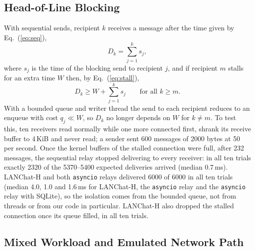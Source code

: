 \documentclass[graybox]{svmult}
\newcommand{\code}[1]{\texttt{#1}}
\newcommand{\lch}{\mbox{LANChat-H}}
\begin{document}
\subsection{Head-of-Line Blocking}
With sequential sends, recipient $k$ receives a message after the time given by Eq.~(\ref{eq:seq}),
\begin{equation}
D_k = \sum_{j=1}^{k} s_j ,
\label{eq:seq}
\end{equation}
where $s_j$ is the time of the blocking send to recipient $j$, and if recipient $m$ stalls for an extra time $W$ then, by Eq.~(\ref{eq:stall}),
\begin{equation}
D_k \ge W + \sum_{j=1}^{k} s_j \qquad \mbox{for all } k \ge m .
\label{eq:stall}
\end{equation}
With a bounded queue and writer thread the send to each recipient reduces to an enqueue with cost $q_j \ll W$, so $D_k$ no longer depends on $W$ for $k \neq m$. To test this, ten receivers read normally while one more connected first, shrank its receive buffer to 4\,KiB and never read; a sender sent 600 messages of 2000 bytes at 50 per second. Once the kernel buffers of the stalled connection were full, after 232 messages, the sequential relay stopped delivering to every receiver: in all ten trials exactly 2320 of the 5370--5400 expected deliveries arrived (median 0.7\,ms). \lch{} and both \code{asyncio} relays delivered 6000 of 6000 in all ten trials (median 4.0, 1.0 and 1.6\,ms for \lch{}, the \code{asyncio} relay and the \code{asyncio} relay with SQLite), so the isolation comes from the bounded queue, not from threads or from our code in particular. \lch{} also dropped the stalled connection once its queue filled, in all ten trials.



\subsection{Mixed Workload and Emulated Network Path}
\end{document}

